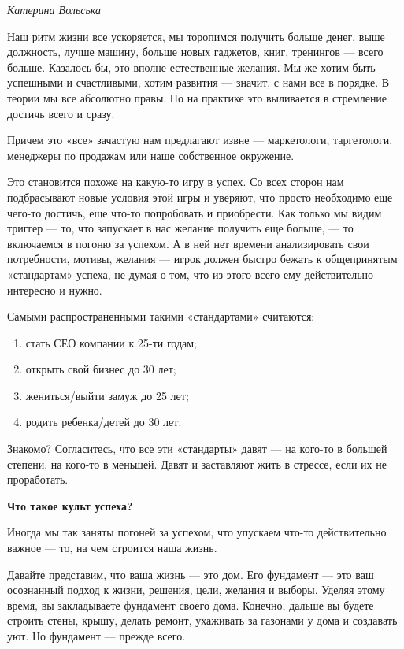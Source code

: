 \textit{Катерина Вольська}

Наш ритм жизни все ускоряется, мы торопимся получить больше денег, выше должность, лучше машину, больше новых гаджетов, книг, тренингов — всего больше. Казалось бы, это вполне естественные желания. Мы же хотим быть успешными и счастливыми, хотим развития — значит, с нами все в порядке. В теории мы все абсолютно правы. Но на практике это выливается в стремление достичь всего и сразу.

\begin{fancyquotes}
    Причем это «все» зачастую нам предлагают извне  — маркетологи, таргетологи, менеджеры по продажам или наше собственное окружение.
\end{fancyquotes}

Это становится похоже на какую-то игру в успех. Со всех сторон нам подбрасывают новые условия этой игры и уверяют, что просто необходимо еще чего-то достичь, еще что-то попробовать и приобрести. Как только мы видим триггер — то, что запускает в нас желание получить еще больше, — то включаемся в погоню за успехом. А в ней нет времени анализировать свои потребности, мотивы, желания — игрок должен быстро бежать к общепринятым «стандартам» успеха, не думая о том, что из этого всего ему действительно интересно и нужно.

Самыми распространенными такими «стандартами» считаются:

\begin{enumerate}
    \item стать СЕО компании к 25-ти годам;
    \item открыть свой бизнес до 30 лет;
    \item жениться/выйти замуж до 25 лет;
    \item родить ребенка/детей до 30 лет.
\end{enumerate}

Знакомо? Согласитесь, что все эти «стандарты» давят — на кого-то в большей степени, на кого-то в меньшей. Давят и заставляют жить в стрессе, если их не проработать.

\textbf{Что такое культ успеха?}

Иногда мы так заняты погоней за успехом, что упускаем что-то действительно важное — то, на чем строится наша жизнь.

Давайте представим, что ваша жизнь — это дом. Его фундамент — это ваш осознанный подход к жизни, решения, цели, желания и выборы. Уделяя этому время, вы закладываете фундамент своего дома. Конечно, дальше вы будете строить стены, крышу, делать ремонт, ухаживать за газонами у дома и создавать уют. Но фундамент — прежде всего.

